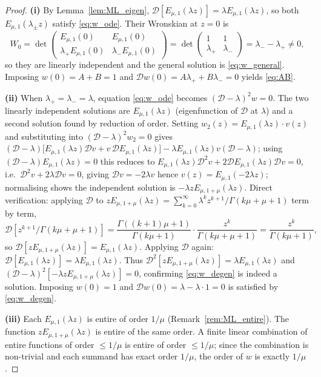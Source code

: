 \documentclass[12pt,a4paper]{amsart}
\newcommand{\ML}[2]{E_{#1,#2}}
\theoremstyle{plain}
\theoremstyle{definition}
\theoremstyle{remark}
\begin{document}
\begin{proof}
\textbf{(i)}
By Lemma~\ref{lem:ML_eigen}, $\mathcal{D}[\ML{\mu}{1}(\lambda z)]=\lambda\ML{\mu}{1}(\lambda z)$,
so both $\ML{\mu}{1}(\lambda_\pm z)$ satisfy \eqref{eq:w_ode}. Their Wronskian
at $z=0$ is
\[
  W_0 = \det\begin{pmatrix}\ML{\mu}{1}(0) & \ML{\mu}{1}(0) \\
  \lambda_+\ML{\mu}{1}(0) & \lambda_-\ML{\mu}{1}(0)\end{pmatrix}
  = \det\begin{pmatrix}1&1\\\lambda_+&\lambda_-\end{pmatrix}
  = \lambda_--\lambda_+\ne 0,
\]
so they are linearly independent and the general solution is \eqref{eq:w_general}.
Imposing $w(0)=A+B=1$ and $\mathcal{D}w(0)=A\lambda_++B\lambda_-=0$ yields
\eqref{eq:AB}.

\textbf{(ii)}
When $\lambda_+=\lambda_-=\lambda$, equation \eqref{eq:w_ode} becomes
$(\mathcal{D}-\lambda)^2 w=0$. The two linearly independent solutions are
$\ML{\mu}{1}(\lambda z)$ (eigenfunction of $\mathcal{D}$ at $\lambda$) and
a second solution found by reduction of order. Setting
$w_2(z)=\ML{\mu}{1}(\lambda z)\cdot v(z)$ and substituting into
$(\mathcal{D}-\lambda)^2 w_2=0$ gives $(\mathcal{D}-\lambda)\bigl[\ML{\mu}{1}(\lambda z)
\mathcal{D}v + v\,\mathcal{D}\ML{\mu}{1}(\lambda z)\bigr]
- \lambda\ML{\mu}{1}(\lambda z)v(\mathcal{D}-\lambda)$; using
$(\mathcal{D}-\lambda)\ML{\mu}{1}(\lambda z)=0$ this reduces to
$\ML{\mu}{1}(\lambda z)\mathcal{D}^2 v + 2\mathcal{D}\ML{\mu}{1}(\lambda z)\mathcal{D}v=0$,
i.e.\ $\mathcal{D}^2 v + 2\lambda\mathcal{D}v=0$, giving $\mathcal{D}v=-2\lambda v$
hence $v(z)=\ML{\mu}{1}(-2\lambda z)$; normalising shows the independent
solution is $-\lambda z\ML{\mu}{1+\mu}(\lambda z)$.
Direct verification: applying $\mathcal{D}$ to $z\ML{\mu}{1+\mu}(\lambda z)
=\sum_{k=0}^\infty\lambda^k z^{k+1}/\Gamma(k\mu+\mu+1)$ term by term,
\[
  \mathcal{D}[z^{k+1}/\Gamma(k\mu+\mu+1)]
  = \frac{\Gamma((k+1)\mu+1)}{\Gamma(k\mu+1)}\cdot\frac{z^k}{\Gamma(k\mu+\mu+1)}
  = \frac{z^k}{\Gamma(k\mu+1)},
\]
so $\mathcal{D}[z\ML{\mu}{1+\mu}(\lambda z)]=\ML{\mu}{1}(\lambda z)$.
Applying $\mathcal{D}$ again:
$\mathcal{D}[\ML{\mu}{1}(\lambda z)]=\lambda\ML{\mu}{1}(\lambda z)$.
Thus $\mathcal{D}^2[z\ML{\mu}{1+\mu}(\lambda z)]=\lambda\ML{\mu}{1}(\lambda z)$
and $(\mathcal{D}-\lambda)^2[-\lambda z\ML{\mu}{1+\mu}(\lambda z)]=0$,
confirming \eqref{eq:w_degen} is indeed a solution. Imposing $w(0)=1$
and $\mathcal{D}w(0)=\lambda-\lambda\cdot 1=0$ is satisfied by \eqref{eq:w_degen}.

\textbf{(iii)}
Each $\ML{\mu}{1}(\lambda z)$ is entire of order $1/\mu$ (Remark~\ref{rem:ML_entire}).
The function $z\ML{\mu}{1+\mu}(\lambda z)$ is entire of the same order.
A finite linear combination of entire functions of order $\le 1/\mu$ is
entire of order $\le 1/\mu$; since the combination is non-trivial and each
summand has exact order $1/\mu$, the order of $w$ is exactly $1/\mu$.
\end{proof}
\end{document}
